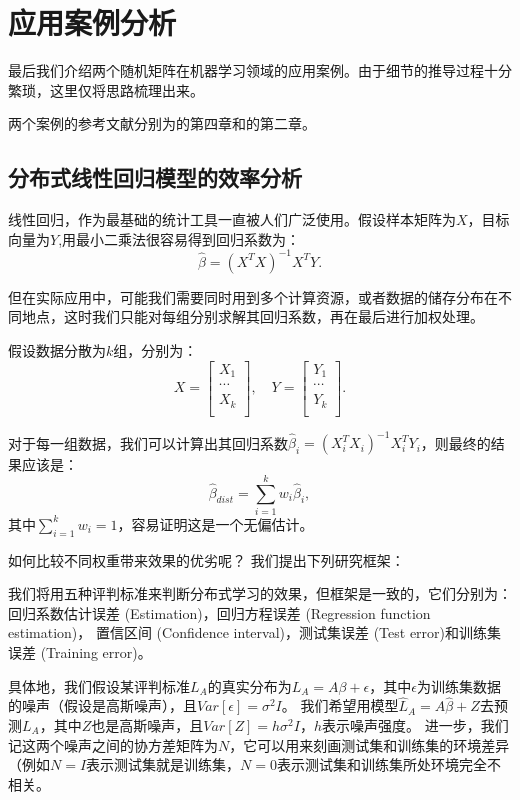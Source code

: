 \documentclass[UTF8,12pt]{ctexart}
\begin{document}
\section{应用案例分析}
最后我们介绍两个随机矩阵在机器学习领域的应用案例。由于细节的推导过程十分繁琐，这里仅将思路梳理出来。

两个案例的参考文献分别为\cite{couillet_liao_2022}的第四章和\cite{random2}的第二章。

\subsection{分布式线性回归模型的效率分析}

线性回归，作为最基础的统计工具一直被人们广泛使用。假设样本矩阵为$X$，目标向量为$Y$,用最小二乘法很容易得到回归系数为：
\[
    \hat \beta = {(X^T X)}^{-1}X^T Y.   
\]

但在实际应用中，可能我们需要同时用到多个计算资源，或者数据的储存分布在不同地点，这时我们只能对每组分别求解其回归系数，再在最后进行加权处理。

假设数据分散为$k$组，分别为：
\[
    X = \left[\begin{matrix}
        X_1 \\
        \cdots \\
        X_k \\
    \end{matrix}
    \right], \quad
    Y = \left[\begin{matrix}
        Y_1 \\
        \cdots \\
        Y_k \\
    \end{matrix}
    \right].
\]  

对于每一组数据，我们可以计算出其回归系数$\hat\beta_i = {(X_i^T X_i)}^{-1}X_i^T Y_i$，则最终的结果应该是：
\[
    \hat\beta_{dist} = \sum\limits_{i=1}^k w_i\hat \beta_i,
\]
其中$\sum\limits_{i=1}^k w_i = 1$，容易证明这是一个无偏估计。

如何比较不同权重带来效果的优劣呢？
我们提出下列研究框架：

我们将用五种评判标准来判断分布式学习的效果，但框架是一致的，它们分别为：
回归系数估计误差 (Estimation)，回归方程误差 (Regression function estimation)，
置信区间 (Confidence interval)，测试集误差 (Test error)和训练集误差 (Training error)。

具体地，我们假设某评判标准$L_A$的真实分布为$L_A = A\beta + \epsilon$，其中$\epsilon$为训练集数据的噪声（假设是高斯噪声），且$Var[\epsilon] = \sigma^2 I$。
我们希望用模型$\hat L_A = A \hat\beta + Z$去预测$L_A$，其中$Z$也是高斯噪声，且$Var[Z] = h\sigma^2 I$，$h$表示噪声强度。
进一步，我们记这两个噪声之间的协方差矩阵为$N$，它可以用来刻画测试集和训练集的环境差异（例如$N=I$表示测试集就是训练集，$N=0$表示测试集和训练集所处环境完全不相关。
\end{document}
